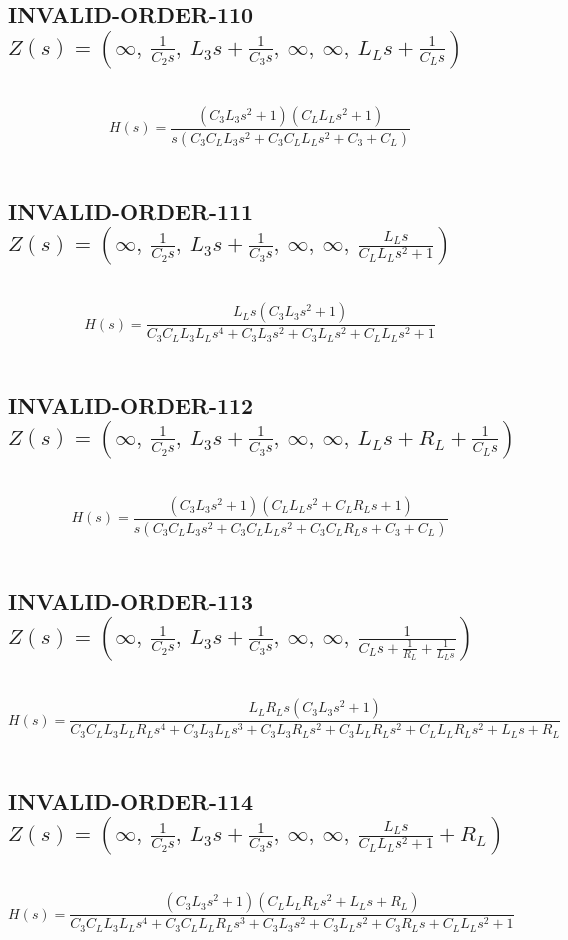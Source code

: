 \documentclass{article}
\begin{document}
\subsection{INVALID-ORDER-110 $Z(s) = \left( \infty, \  \frac{1}{C_{2} s}, \  L_{3} s + \frac{1}{C_{3} s}, \  \infty, \  \infty, \  L_{L} s + \frac{1}{C_{L} s}\right)$ } \ 
\textbf{\[H(s) = \frac{\left(C_{3} L_{3} s^{2} + 1\right) \left(C_{L} L_{L} s^{2} + 1\right)}{s \left(C_{3} C_{L} L_{3} s^{2} + C_{3} C_{L} L_{L} s^{2} + C_{3} + C_{L}\right)}\] } \ 
\subsection{INVALID-ORDER-111 $Z(s) = \left( \infty, \  \frac{1}{C_{2} s}, \  L_{3} s + \frac{1}{C_{3} s}, \  \infty, \  \infty, \  \frac{L_{L} s}{C_{L} L_{L} s^{2} + 1}\right)$ } \ 
\textbf{\[H(s) = \frac{L_{L} s \left(C_{3} L_{3} s^{2} + 1\right)}{C_{3} C_{L} L_{3} L_{L} s^{4} + C_{3} L_{3} s^{2} + C_{3} L_{L} s^{2} + C_{L} L_{L} s^{2} + 1}\] } \ 
\subsection{INVALID-ORDER-112 $Z(s) = \left( \infty, \  \frac{1}{C_{2} s}, \  L_{3} s + \frac{1}{C_{3} s}, \  \infty, \  \infty, \  L_{L} s + R_{L} + \frac{1}{C_{L} s}\right)$ } \ 
\textbf{\[H(s) = \frac{\left(C_{3} L_{3} s^{2} + 1\right) \left(C_{L} L_{L} s^{2} + C_{L} R_{L} s + 1\right)}{s \left(C_{3} C_{L} L_{3} s^{2} + C_{3} C_{L} L_{L} s^{2} + C_{3} C_{L} R_{L} s + C_{3} + C_{L}\right)}\] } \ 
\subsection{INVALID-ORDER-113 $Z(s) = \left( \infty, \  \frac{1}{C_{2} s}, \  L_{3} s + \frac{1}{C_{3} s}, \  \infty, \  \infty, \  \frac{1}{C_{L} s + \frac{1}{R_{L}} + \frac{1}{L_{L} s}}\right)$ } \ 
\textbf{\[H(s) = \frac{L_{L} R_{L} s \left(C_{3} L_{3} s^{2} + 1\right)}{C_{3} C_{L} L_{3} L_{L} R_{L} s^{4} + C_{3} L_{3} L_{L} s^{3} + C_{3} L_{3} R_{L} s^{2} + C_{3} L_{L} R_{L} s^{2} + C_{L} L_{L} R_{L} s^{2} + L_{L} s + R_{L}}\] } \ 
\subsection{INVALID-ORDER-114 $Z(s) = \left( \infty, \  \frac{1}{C_{2} s}, \  L_{3} s + \frac{1}{C_{3} s}, \  \infty, \  \infty, \  \frac{L_{L} s}{C_{L} L_{L} s^{2} + 1} + R_{L}\right)$ } \ 
\textbf{\[H(s) = \frac{\left(C_{3} L_{3} s^{2} + 1\right) \left(C_{L} L_{L} R_{L} s^{2} + L_{L} s + R_{L}\right)}{C_{3} C_{L} L_{3} L_{L} s^{4} + C_{3} C_{L} L_{L} R_{L} s^{3} + C_{3} L_{3} s^{2} + C_{3} L_{L} s^{2} + C_{3} R_{L} s + C_{L} L_{L} s^{2} + 1}\] } \ 
\end{document}
